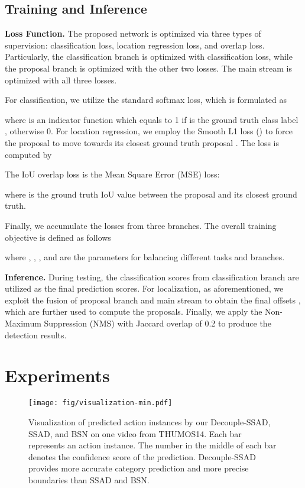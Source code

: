 \documentclass{article}
\begin{document}
\subsection{Training and Inference}

\textbf{Loss Function.}
The proposed network is optimized via three types of supervision: classification loss, location regression loss, and overlap loss. Particularly, the classification branch is optimized with classification loss, while the proposal branch is optimized with the other two losses. The main stream is optimized with all three losses.

For classification, we utilize the standard softmax loss, which is formulated as

where  is an indicator function which equals to 1 if  is the ground truth class label , otherwise 0.
For location regression, we employ the Smooth L1 loss () to force the proposal  to move towards its closest ground truth proposal . The loss is computed by

The IoU overlap loss is the Mean Square Error (MSE) loss:

where  is the ground truth IoU value between the proposal and its closest ground truth.

Finally, we accumulate the losses from three branches. The overall training objective is defined as follows

where , , , and  are the parameters for balancing different tasks and branches.

\textbf{Inference.}
During testing, the classification scores from classification branch are utilized as the final prediction scores. For localization, as aforementioned, we exploit the fusion of proposal branch and main stream to obtain the final offsets , which are further used to compute the proposals. Finally, we apply the Non-Maximum Suppression (NMS) with Jaccard overlap of 0.2 to produce the detection results.


\section{Experiments}

\begin{figure*}[ht]
    \texttt{[image: fig/visualization-min.pdf]}
    \centering
    \caption{Visualization of predicted action instances by our Decouple-SSAD, SSAD, and BSN on one video from THUMOS14. Each bar represents an action instance. The number in the middle of each bar denotes the confidence score of the prediction. Decouple-SSAD provides more accurate category prediction and more precise boundaries than SSAD and BSN. }
\label{fig:visualization}
\end{figure*}
\end{document}

